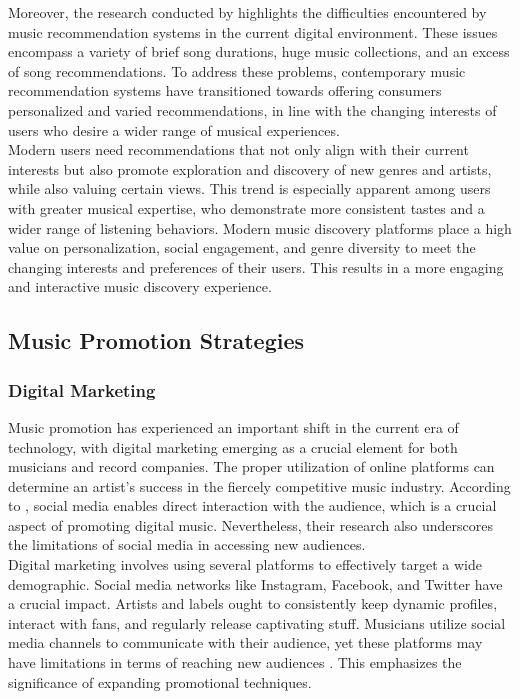 Moreover, the research conducted by \textcite{perera20} highlights the difficulties encountered by music recommendation systems in the current digital environment. These issues encompass a variety of brief song durations, huge music collections, and an excess of song recommendations. To address these problems, contemporary music recommendation systems have transitioned towards offering consumers personalized and varied recommendations, in line with the changing interests of users who desire a wider range of musical experiences. \\

Modern users need recommendations that not only align with their current interests but also promote exploration and discovery of new genres and artists, while also valuing certain views. This trend is especially apparent among users with greater musical expertise, who demonstrate more consistent tastes and a wider range of listening behaviors. Modern music discovery platforms place a high value on personalization, social engagement, and genre diversity to meet the changing interests and preferences of their users. This results in a more engaging and interactive music discovery experience. \pagebreak

\subsection{Music Promotion Strategies}
\subsubsection{Digital Marketing}
Music promotion has experienced an important shift in the current era of technology, with digital marketing emerging as a crucial element for both musicians and record companies. The proper utilization of online platforms can determine an artist's success in the fiercely competitive music industry. According to \textcite{haynes18}, social media enables direct interaction with the audience, which is a crucial aspect of promoting digital music. Nevertheless, their research also underscores the limitations of social media in accessing new audiences. \\

Digital marketing involves using several platforms to effectively target a wide demographic. Social media networks like Instagram, Facebook, and Twitter have a crucial impact. Artists and labels ought to consistently keep dynamic profiles, interact with fans, and regularly release captivating stuff. Musicians utilize social media channels to communicate with their audience, yet these platforms may have limitations in terms of reaching new audiences \parencite{haynes18}. This emphasizes the significance of expanding promotional techniques. \\

